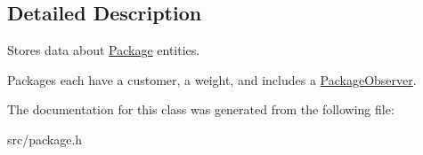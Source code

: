 \subsection{Detailed Description}
Stores data about \hyperlink{classcsci3081_1_1Package}{Package} entities. 

Packages each have a customer, a weight, and includes a \hyperlink{classcsci3081_1_1PackageObserver}{Package\+Observer}. 

The documentation for this class was generated from the following file\+:\begin{DoxyCompactItemize}
\item 
src/package.\+h\end{DoxyCompactItemize}
